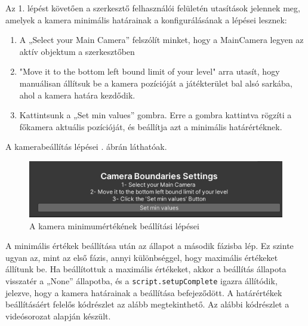 Az 1. lépést követően a szerkesztő felhasználói felületén utasítások jelennek meg, amelyek a kamera minimális határainak a konfigurálásának a lépései lesznek:
\begin{enumerate}
\item A „Select your Main Camera” felszólít minket, hogy a MainCamera legyen az aktív objektum a szerkesztőben
\item "Move it to the bottom left bound limit of your level" arra utasít, hogy manuálisan állítsuk be a kamera pozícióját a játékterület bal alsó sarkába, ahol a kamera határa kezdődik.
\item Kattintsunk a „Set min values” gombra. Erre a gombra kattintva rögzíti a főkamera aktuális pozícióját, és beállítja azt a minimális határértéknek.
\end{enumerate}
A kamerabeállítás lépései . ábrán láthatóak.

\begin{figure}[ht]
\centering
\includegraphics[scale = 0.9]{images/camerasteps.png}
\caption{A kamera minimumértékének beállítási lépései}
\label{fig:camerasteps}
\end{figure}

A minimális értékek beállítása után az állapot a második fázisba lép. Ez szinte ugyan az, mint az első fázis, annyi különbséggel, hogy maximális értékeket állítunk be. Ha beállítottuk a maximális értékeket, akkor a beállítás állapota visszatér a „None” állapotba, és a \texttt{script.setupComplete} igazra állítódik, jelezve, hogy a kamera határainak a beállítása befejeződött. A határértékek beállításáért felelős kódrészlet az alább megtekinthető. Az alábbi kódrészlet a \cite{youtubeplaylist} videósorozat alapján készült.

